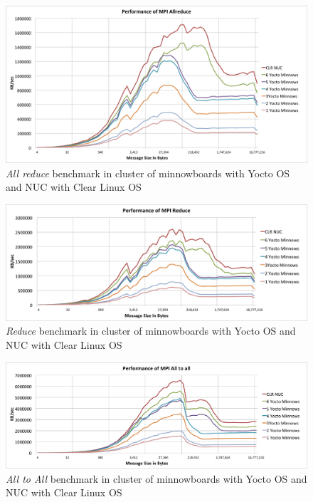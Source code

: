 \begin{figure}[H]
\centering
\includegraphics[width=1.0\textwidth]{images/mpbench_cluster_experiments/mpi_all_reduce.png}
\caption{\textit{All reduce} benchmark in cluster of minnowboards with Yocto OS and NUC
with Clear Linux OS}
\label{all_reduce_cluster}
\end{figure}


\begin{figure}[H]
\centering
\includegraphics[width=1.0\textwidth]{images/mpbench_cluster_experiments/mpi_reduce.png}
\caption{\textit{Reduce} benchmark in cluster of minnowboards with Yocto OS and NUC
with Clear Linux OS}
\label{reduce_cluster}
\end{figure}


\begin{figure}[H]
\centering
\includegraphics[width=1.0\textwidth]{images/mpbench_cluster_experiments/mpi_alltoall.png}
\caption{\textit{All to All} benchmark in cluster of minnowboards with Yocto OS and NUC
with Clear Linux OS}
\label{all_to_all_cluster}
\end{figure}



